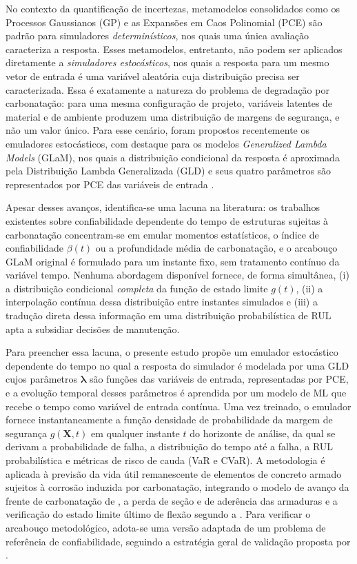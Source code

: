No contexto da quantificação de incertezas, metamodelos consolidados como os Processos Gaussianos (GP) \citep{rasmussen2006} e as Expansões em Caos Polinomial (PCE) \citep{xiu2002, blatman2011} são padrão para simuladores \textit{determinísticos}, nos quais uma única avaliação caracteriza a resposta. Esses metamodelos, entretanto, não podem ser aplicados diretamente a \textit{simuladores estocásticos}, nos quais a resposta para um mesmo vetor de entrada é uma variável aleatória cuja distribuição precisa ser caracterizada. Essa é exatamente a natureza do problema de degradação por carbonatação: para uma mesma configuração de projeto, variáveis latentes de material e de ambiente produzem uma distribuição de margens de segurança, e não um valor único. Para esse cenário, foram propostos recentemente os emuladores estocásticos, com destaque para os modelos \textit{Generalized Lambda Models} (GLaM), nos quais a distribuição condicional da resposta é aproximada pela Distribuição Lambda Generalizada (GLD) e seus quatro parâmetros são representados por PCE das variáveis de entrada \citep{ZhuSudret2020, ZhuSudret2021}.

Apesar desses avanços, identifica-se uma lacuna na literatura: os trabalhos existentes sobre confiabilidade dependente do tempo de estruturas sujeitas à carbonatação concentram-se em emular momentos estatísticos, o índice de confiabilidade $\beta(t)$ ou a profundidade média de carbonatação, e o arcabouço GLaM original é formulado para um instante fixo, sem tratamento contínuo da variável tempo. Nenhuma abordagem disponível fornece, de forma simultânea, (i) a distribuição condicional \textit{completa} da função de estado limite $g(t)$, (ii) a interpolação contínua dessa distribuição entre instantes simulados e (iii) a tradução direta dessa informação em uma distribuição probabilística de RUL apta a subsidiar decisões de manutenção.

Para preencher essa lacuna, o presente estudo propõe um emulador estocástico dependente do tempo no qual a resposta do simulador é modelada por uma GLD cujos parâmetros $\boldsymbol{\lambda}$ são funções das variáveis de entrada, representadas por PCE, e a evolução temporal desses parâmetros é aprendida por um modelo de ML que recebe o tempo como variável de entrada contínua. Uma vez treinado, o emulador fornece instantaneamente a função densidade de probabilidade da margem de segurança $g(\mathbf{X}, t)$ em qualquer instante $t$ do horizonte de análise, da qual se derivam a probabilidade de falha, a distribuição do tempo até a falha, a RUL probabilística e métricas de risco de cauda (VaR e CVaR). A metodologia é aplicada à previsão da vida útil remanescente de elementos de concreto armado sujeitos à corrosão induzida por carbonatação, integrando o modelo de avanço da frente de carbonatação de \citet{possan2010}, a perda de seção e de aderência das armaduras \citep{val1997, azad2010, peng2016} e a verificação do estado limite último de flexão segundo a \citet{nbr6118}. Para verificar o arcabouço metodológico, adota-se uma versão adaptada de um problema de referência de confiabilidade, seguindo a estratégia geral de validação proposta por \citet{pires2024}.

